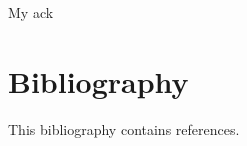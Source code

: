 \documentclass[12pt]{cmuthesis}
\begin{document}
\begin{acknowledgments}
My ack
\end{acknowledgments}

\pagestyle{plain}

\tableofcontents
{}
\listoffigures
{}
\listoftables
\listofalgorithms

\mainmatter









% 
% 

% 
% 
% 

% 

\chapter*{Bibliography}

\vspace{-25mm}
This bibliography contains  references.
\vspace{10mm}

\printbibliography[heading=none]
\end{document}
